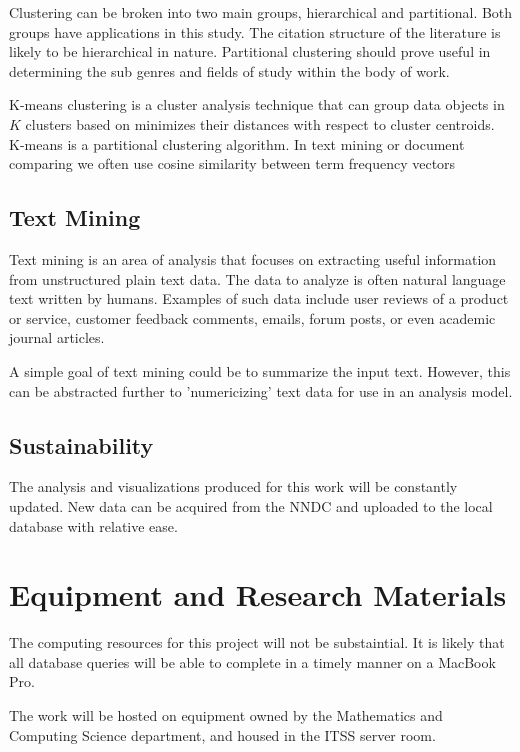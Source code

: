 \documentclass[12pt]{article}
\begin{document}
\begin{doublespacing}
Clustering can be broken into two main groups, hierarchical and partitional.
Both groups have applications in this study.
The citation structure of the literature is likely to be hierarchical in nature.
Partitional clustering should prove useful in determining the sub genres and fields of study within the body of work.

K-means clustering is a cluster analysis technique that can group data objects in $K$ clusters based on minimizes their distances with respect to cluster centroids.
K-means is a partitional clustering algorithm.
In text mining or document comparing we often use cosine similarity between term frequency vectors

\subsection{Text Mining}
Text mining is an area of analysis that focuses on extracting useful information from unstructured plain text data.
The data to analyze is often natural language text written by humans.
Examples of such data include user reviews of a product or service, customer feedback comments, emails, forum posts, or even academic journal articles.

A simple goal of text mining could be to summarize the input text.
However, this can be abstracted further to 'numericizing' text data for use in an analysis model.

\subsection{Sustainability} \label{sustainability}
The analysis and visualizations produced for this work will be constantly updated.
New data can be acquired from the NNDC and uploaded to the local database with relative ease.


\pagebreak
\section{Equipment and Research Materials}

The computing resources for this project will not be substaintial.
It is likely that all database queries will be able to complete in a timely manner on a MacBook Pro.

The work will be hosted on equipment owned by the Mathematics and Computing Science department, and housed in the ITSS server room.


\end{doublespacing}
\end{document}
